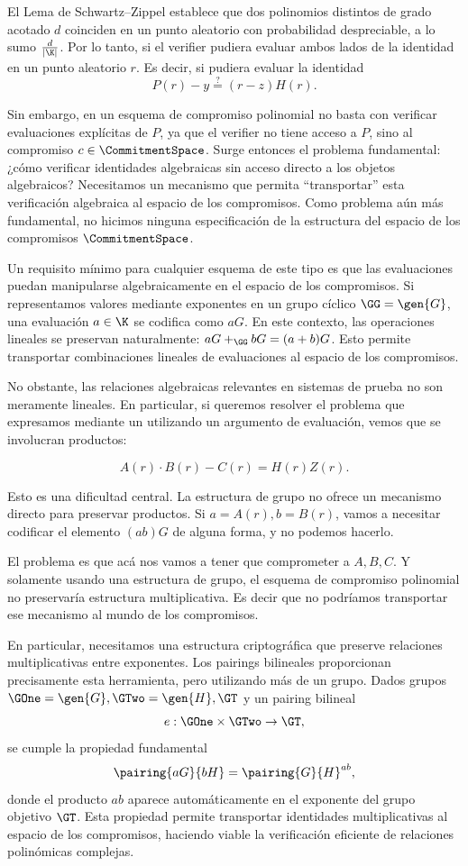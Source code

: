 El Lema de Schwartz–Zippel establece que dos polinomios distintos de grado acotado $d$ coinciden en un punto aleatorio con probabilidad despreciable, a lo sumo $\frac{d}{|\K|}$. Por lo tanto, si el verifier pudiera evaluar ambos lados de la identidad en un punto aleatorio $r$. Es decir, si pudiera evaluar la identidad
$$P(r) - y \overset{?}{=} (r - z)H(r).$$

Sin embargo, en un esquema de compromiso polinomial no basta con verificar evaluaciones explícitas de $P$, ya que el verifier no tiene acceso a $P$, sino al compromiso $c \in \CommitmentSpace$. Surge entonces el problema fundamental: ¿cómo verificar identidades algebraicas sin acceso directo a los objetos algebraicos? Necesitamos un mecanismo que permita “transportar” esta verificación algebraica al espacio de los compromisos. Como problema aún más fundamental, no hicimos ninguna especificación de la estructura del espacio de los compromisos $\CommitmentSpace$.

Un requisito mínimo para cualquier esquema de este tipo es que las evaluaciones puedan manipularse algebraicamente en el espacio de los compromisos. Si representamos valores mediante exponentes en un grupo cíclico $\GG = \gen{G}$, una evaluación $a \in \K$ se codifica como $aG$. En este contexto, las operaciones lineales se preservan naturalmente: $aG +_\GG bG = (a + b)G$. Esto permite transportar combinaciones lineales de evaluaciones al espacio de los compromisos.

No obstante, las relaciones algebraicas relevantes en sistemas de prueba no son meramente lineales. En particular, si queremos resolver el problema que expresamos mediante un \QAP utilizando un argumento de evaluación, vemos que se involucran productos:

$$A(r) \cdot B(r) - C(r) = H(r)Z(r).$$

Esto es una dificultad central. La estructura de grupo no ofrece un mecanismo directo para preservar productos. Si $a = A(r), b = B(r)$, vamos a necesitar codificar el elemento $(ab)G$ de alguna forma, y no podemos hacerlo.

El problema es que acá nos vamos a tener que comprometer a $A, B, C$. Y solamente usando una estructura de grupo, el esquema de compromiso polinomial no preservaría estructura multiplicativa. Es decir que no podríamos transportar ese mecanismo al mundo de los compromisos.

En particular, necesitamos una estructura criptográfica que preserve relaciones multiplicativas entre exponentes.  Los pairings bilineales proporcionan precisamente esta herramienta, pero utilizando más de un grupo. Dados grupos $\GOne = \gen{G}, \GTwo = \gen{H}, \GT$ y un pairing bilineal
$$e: \GOne \times \GTwo \to \GT,$$
se cumple la propiedad fundamental
$$\pairing{aG}{bH} = \pairing{G}{H}^{ab},$$
donde el producto $ab$ aparece automáticamente en el exponente del grupo objetivo $\GT$. Esta propiedad permite transportar identidades multiplicativas al espacio de los compromisos, haciendo viable la verificación eficiente de relaciones polinómicas complejas.

